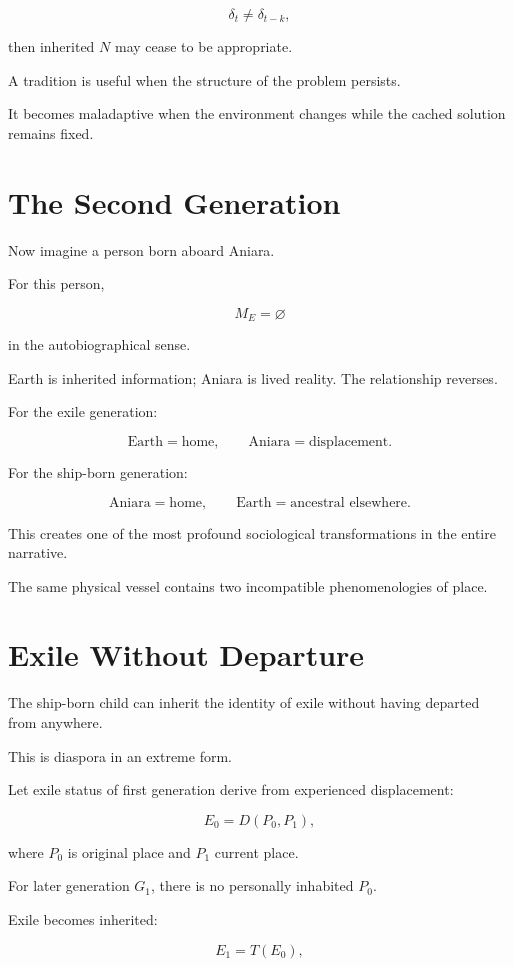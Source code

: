 \documentclass[11pt,oneside]{book}
\theoremstyle{definition}
\theoremstyle{remark}
\begin{document}
\[
\delta_t\neq\delta_{t-k},
\]

then inherited \(N\) may cease to be appropriate.

A tradition is useful when the structure of the problem persists.

It becomes maladaptive when the environment changes while the cached solution remains fixed.

\section{The Second Generation}

Now imagine a person born aboard Aniara.

For this person,

\[
M_E=\varnothing
\]

in the autobiographical sense.

Earth is inherited information; Aniara is lived reality. The relationship reverses.

For the exile generation:

\[
\text{Earth}=\text{home},
\qquad
\text{Aniara}=\text{displacement}.
\]

For the ship-born generation:

\[
\text{Aniara}=\text{home},
\qquad
\text{Earth}=\text{ancestral elsewhere}.
\]

This creates one of the most profound sociological transformations in the entire narrative.

The same physical vessel contains two incompatible phenomenologies of place.

\section{Exile Without Departure}

The ship-born child can inherit the identity of exile without having departed from anywhere.

This is diaspora in an extreme form.

Let exile status of first generation derive from experienced displacement:

\[
E_0
=
D(P_0,P_1),
\]

where \(P_0\) is original place and \(P_1\) current place.

For later generation \(G_1\), there is no personally inhabited \(P_0\).

Exile becomes inherited:

\[
E_1
=
T(E_0),
\]
\end{document}
